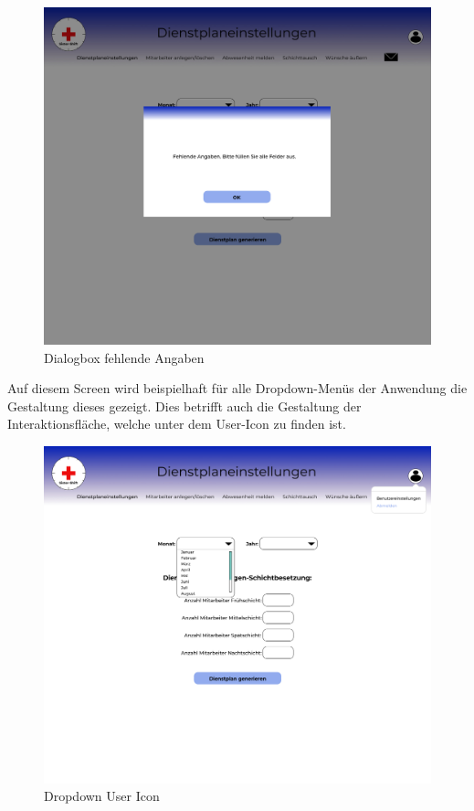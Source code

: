 \documentclass[11pt,
paper=a4,
bibtotocnumbered,	  %
liststotocnumbered,  %
DIV=calc,		  %
tablecaptionabove,	  %
headinclude,
]{article}
\begin{document}
\begin{figure}[H]
\includegraphics[width=1\textwidth]{Bilder/Screens/Dienstplaneinstellungen-Dialogbox(2).jpg}{\centering}
\caption{Dialogbox fehlende Angaben}
\end{figure}
Auf diesem Screen wird beispielhaft für alle Dropdown-Menüs der Anwendung die Gestaltung dieses gezeigt. Dies betrifft auch die Gestaltung der Interaktionsfläche, welche unter dem User-Icon zu finden ist.
\begin{figure}[H]
\includegraphics[width=1\textwidth]{Bilder/Screens/DropdownundUsersettings.jpg}{\centering}
\caption{Dropdown User Icon}
\end{figure}
\end{document}
